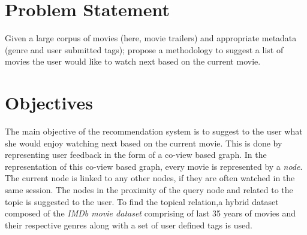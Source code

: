 \section{Problem Statement}
Given a large corpus of movies (here, movie trailers) and appropriate metadata (genre and user submitted tags); propose  a methodology to suggest a list of movies the user would like to watch next based on the current movie.

\section{Objectives}

The main objective of the recommendation system is to suggest to the user what she would enjoy watching next based on the current movie. This is done by representing user feedback in the form of a co-view based graph. In the representation of this co-view based graph, every movie is represented by a \textit{node}. The current node is linked to any other nodes, if they are often watched in the same session. The nodes in the proximity of the query node and related to the topic is suggested to the user. To find the topical relation,a hybrid dataset composed of the \textit{IMDb movie dataset} comprising of last 35 years of movies and their respective genres along with a set of user defined tags is used. 